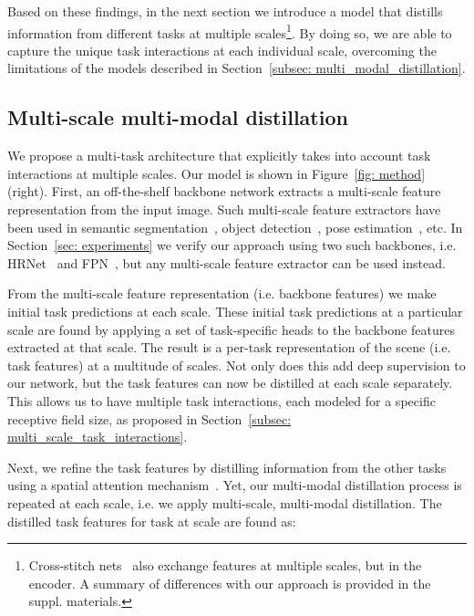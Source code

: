 \documentclass[runningheads]{llncs}
\begin{document}
Based on these findings, in the next section we introduce a model that distills information from different tasks at multiple scales\footnote{Cross-stitch nets~\cite{misra2016cross} also exchange features at multiple scales, but in the encoder. A summary of differences with our approach is provided in the suppl. materials.}. By doing so, we are able to capture the unique task interactions at each individual scale, overcoming the limitations of the models described in Section~\ref{subsec: multi_modal_distillation}.

\subsection{Multi-scale multi-modal distillation}
\label{subsec: multi_scale_distillation}
We propose a multi-task architecture that explicitly takes into account task interactions at multiple scales. Our model is shown in Figure~\ref{fig: method} (right). First, an off-the-shelf backbone network extracts a multi-scale feature representation from the input image. Such multi-scale feature extractors have been used in semantic segmentation~\cite{ronneberger2015u,wang2019deep,kirillov2019panoptic}, object detection~\cite{lin2017feature,wang2019deep}, pose estimation~\cite{newell2016stacked,sun2019deep}, etc. In Section~\ref{sec: experiments} we verify our approach using two such backbones, i.e. HRNet~\cite{wang2019deep} and FPN~\cite{lin2017feature}, but any multi-scale feature extractor can be used instead.

From the multi-scale feature representation (i.e. backbone features) we make initial task predictions at each scale. These initial task predictions at a particular scale are found by applying a set of task-specific heads to the backbone features extracted at that scale. The result is a per-task representation of the scene (i.e. task features) at a multitude of scales. Not only does this add deep supervision to our network, but the task features can now be distilled at each scale separately. This allows us to have multiple task interactions, each modeled for a specific receptive field size, as proposed in Section~\ref{subsec: multi_scale_task_interactions}.

Next, we refine the task features by distilling information from the other tasks using a spatial attention mechanism~\cite{xu2018pad}. Yet, our multi-modal distillation process is repeated at each scale, i.e. we apply multi-scale, multi-modal distillation. The distilled task features  for task  at scale  are found as:
\end{document}
